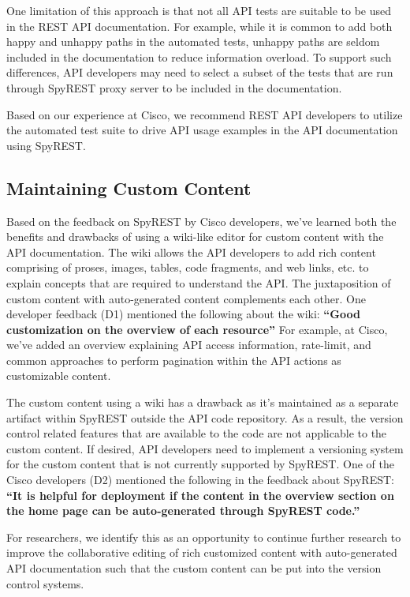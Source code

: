 \documentclass[10pt, conference]{IEEEtran}
\begin{document}
One limitation of this approach is that not all API tests are suitable to be used in the REST API documentation. For example, while it is common to add both happy and unhappy paths in the automated tests, unhappy paths are seldom included in the documentation to reduce information overload. To support such differences, API developers may need to select a subset of the tests that are run through SpyREST proxy server to be included in the documentation.

Based on our experience at Cisco, we recommend REST API developers to utilize the automated test suite to drive API usage examples in the API documentation using SpyREST.

\subsection{Maintaining Custom Content}
Based on the feedback on SpyREST by Cisco developers, we've learned both the benefits and drawbacks of using a wiki-like editor for custom content with the API documentation. The wiki allows the API developers to add rich content comprising of proses, images, tables, code fragments, and web links, etc. to explain concepts that are required to understand the API. The juxtaposition of custom content with auto-generated content complements each other. One developer feedback (D1) mentioned the following about the wiki: \textbf{``Good customization on the overview of each resource''} For example, at Cisco, we've added an overview explaining API access information, rate-limit, and common approaches to perform pagination within the API actions as customizable content.

The custom content using a wiki has a drawback as it's maintained as a separate artifact within SpyREST outside the API code repository. As a result, the version control related features that are available to the code are not applicable to the custom content. If desired, API developers need to implement a versioning system for the custom content that is not currently supported by SpyREST. One of the Cisco developers (D2) mentioned the following in the feedback about SpyREST: \textbf{``It is helpful for deployment if the content in the overview section on the home page can be auto-generated through SpyREST code.''}

For researchers, we identify this as an opportunity to continue further research to improve the collaborative editing of rich customized content with auto-generated API documentation such that the custom content can be put into the version control systems.
\end{document}
